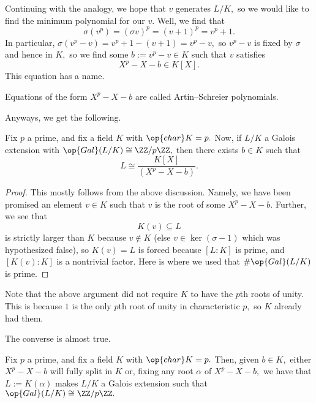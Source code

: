 Continuing with the analogy, we hope that $v$ generates $L/K,$ so we would like to find the minimum polynomial for our $v.$ Well, we find that
\[\sigma\left(v^p\right)=(\sigma v)^p=(v+1)^p=v^p+1.\]
In particular, $\sigma\left(v^p-v\right)=v^p+1-(v+1)=v^p-v,$ so $v^p-v$ is fixed by $\sigma$ and hence in $K,$ so we find some $b:=v^p-v\in K$ such that $v$ satisfies
\[X^p-X-b\in K[X].\]
This equation has a name.
\begin{definition}
	Equations of the form $X^p-X-b$ are called Artin--Schreier polynomials.
\end{definition}
Anyways, we get the following.
\begin{theorem}
	Fix $p$ a prime, and fix a field $K$ with $\op{char}K=p.$ Now, if $L/K$ a Galois extension with $\op{Gal}(L/K)\cong\ZZ/p\ZZ,$ then there exists $b\in K$ such that
	\[L\cong\frac{K[X]}{\left(X^p-X-b\right)}.\]
\end{theorem}
\begin{proof}
	This mostly follows from the above discussion. Namely, we have been promised an element $v\in K$ such that $v$ is the root of some $X^p-X-b.$ Further, we see that
	\[K(v)\subseteq L\]
	is strictly larger than $K$ because $v\notin K$ (else $v\in\ker(\sigma-1)$ which was hypothesized false), so $K(v)=L$ is forced because $[L:K]$ is prime, and $[K(v):K]$ is a nontrivial factor. Here is where we used that $\#\op{Gal}(L/K)$ is prime.
\end{proof}
\begin{remark}[Nir]
	Note that the above argument did not require $K$ to have the $p$th roots of unity. This is because $1$ is the only $p$th root of unity in characteristic $p,$ so $K$ already had them.
\end{remark}
The converse is almost true.
\begin{proposition}
	Fix $p$ a prime, and fix a field $K$ with $\op{char}K=p.$ Then, given $b\in K,$ either $X^p-X-b$ will fully split in $K$ or, fixing any root $\alpha$ of $X^p-X-b,$ we have that $L:=K(\alpha)$ makes $L/K$ a Galois extension such that $\op{Gal}(L/K)\cong\ZZ/p\ZZ.$
\end{proposition}
